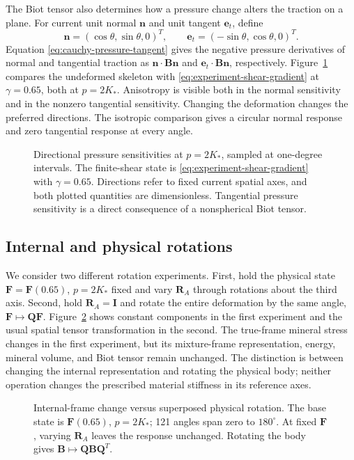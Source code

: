 The Biot tensor also determines how a pressure change alters the traction
on a plane. For current unit normal \(\mathbf n\) and unit tangent
\(\mathbf e_t\), define
\begin{equation}
 \mathbf n=(\cos\theta,\sin\theta,0)^T,\qquad
 \mathbf e_t=(-\sin\theta,\cos\theta,0)^T.
 \label{eq:experiment-plane-directions}
\end{equation}
Equation \eqref{eq:cauchy-pressure-tangent} gives the negative pressure
derivatives of normal and tangential traction as
\(\mathbf n\cdot\mathbf B\mathbf n\) and
\(\mathbf e_t\cdot\mathbf B\mathbf n\), respectively.
Figure~\ref{fig:spherical-directional} compares the undeformed skeleton
with \eqref{eq:experiment-shear-gradient} at \(\gamma=0.65\), both at
\(p=2K_*\). Anisotropy is visible both in the normal sensitivity and in
the nonzero tangential sensitivity. Changing the deformation changes the
preferred directions. The isotropic comparison gives a circular normal
response and zero tangential response at every angle.
\begin{figure}[htbp]
 \centering
 \caption{Directional pressure sensitivities at \(p=2K_*\), sampled at
 one-degree intervals. The finite-shear state is
 \eqref{eq:experiment-shear-gradient} with \(\gamma=0.65\). Directions
 refer to fixed current spatial axes, and both plotted quantities are
 dimensionless. Tangential pressure sensitivity is a direct consequence
 of a nonspherical Biot tensor.}
 \label{fig:spherical-directional}
\end{figure}

\subsection{Internal and physical rotations}
We consider two different rotation experiments. First, hold the physical
state \(\mathbf F=\mathbf F(0.65)\), \(p=2K_*\) fixed and vary
\(\mathbf R_A\) through rotations about the third axis. Second, hold
\(\mathbf R_A=\mathbf I\) and rotate the entire deformation by the
same angle, \(\mathbf F\mapsto\mathbf Q\mathbf F\).
Figure~\ref{fig:spherical-rotation} shows constant components in the first
experiment and the usual spatial tensor transformation in the second.
The true-frame mineral stress changes in the first experiment, but its
mixture-frame representation, energy, mineral volume, and Biot tensor
remain unchanged. The distinction is between changing the internal
representation and rotating the physical body; neither operation changes
the prescribed material stiffness in its reference axes.
\begin{figure}[htbp]
 \centering
 \caption{Internal-frame change versus superposed physical rotation.
 The base state is \(\mathbf F(0.65)\), \(p=2K_*\); 121 angles span
 zero to \(180^\circ\). At fixed \(\mathbf F\), varying
 \(\mathbf R_A\) leaves the response unchanged. Rotating the body gives
 \(\mathbf B\mapsto\mathbf Q\mathbf B\mathbf Q^T\).}
 \label{fig:spherical-rotation}
\end{figure}

